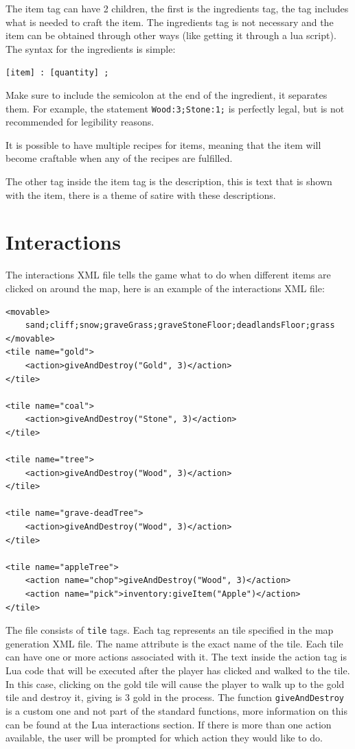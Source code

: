 \documentclass{book}
\begin{document}
The item tag can have 2 children, the first is the ingredients tag, the tag includes what is needed to craft the item. The ingredients tag is not necessary and the item can be obtained through other ways (like getting it through a lua script). The syntax for the ingredients is simple:

\begin{center}
		\texttt{[item] : [quantity] ;}
\end{center}

Make sure to include the semicolon at the end of the ingredient, it separates them. For example, the statement \texttt{Wood:3;Stone:1;} is perfectly legal, but is not recommended for legibility reasons.

It is possible to have multiple recipes for items, meaning that the item will become craftable when any of the recipes are fulfilled.

The other tag inside the item tag is the description, this is text that is shown with the item, there is a theme of satire with these descriptions.

\section{Interactions}
The interactions XML file tells the game what to do when different items are clicked on around the map, here is an example of the interactions XML file:

\begin{verbatim}
<movable>
	sand;cliff;snow;graveGrass;graveStoneFloor;deadlandsFloor;grass
</movable>
<tile name="gold">
	<action>giveAndDestroy("Gold", 3)</action>
</tile>

<tile name="coal">
	<action>giveAndDestroy("Stone", 3)</action>
</tile>

<tile name="tree">
	<action>giveAndDestroy("Wood", 3)</action>
</tile>

<tile name="grave-deadTree">
	<action>giveAndDestroy("Wood", 3)</action>
</tile>

<tile name="appleTree">
	<action name="chop">giveAndDestroy("Wood", 3)</action>
	<action name="pick">inventory:giveItem("Apple")</action>
</tile>
\end{verbatim}

The file consists of \texttt{tile} tags. Each tag represents an tile specified in the map generation XML file. The name attribute is the exact name of the tile. Each tile can have one or more actions associated with it. The text inside the action tag is Lua code that will be executed after the player has clicked and walked to the tile. In this case, clicking on the gold tile will cause the player to walk up to the gold tile and destroy it, giving is 3 gold in the process. The function \texttt{giveAndDestroy} is a custom one and not part of the standard functions, more information on this can be found at the Lua interactions section. If there is more than one action available, the user will be prompted for which action they would like to do.
\end{document}
